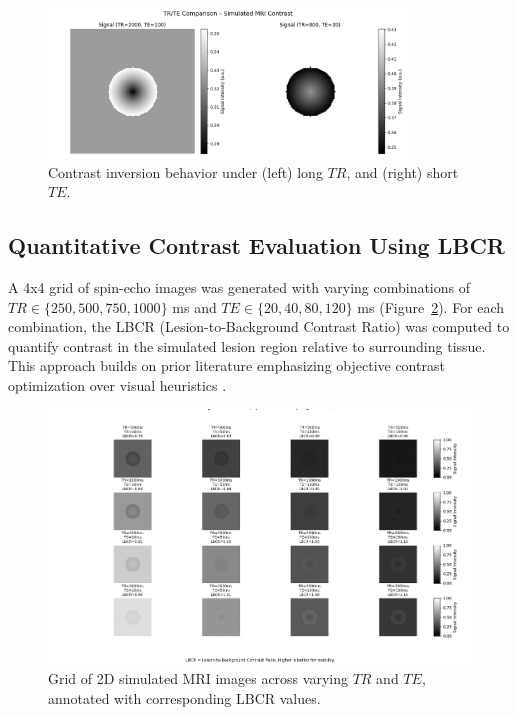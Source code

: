 \documentclass[10pt,a4paper,twoside]{article}
\begin{document}
\begin{figure}[htbp!]
\centering
\includegraphics[width=0.85\textwidth]{trtecomparisonforcontrast.png}
\caption{Contrast inversion behavior under (left) long \( TR \), and (right) short \( TE \).}
\label{fig:inversion}
\end{figure}

\subsection{Quantitative Contrast Evaluation Using LBCR}

A 4x4 grid of spin-echo images was generated with varying combinations of \( TR \in \{250, 500, 750, 1000\} \) ms and \( TE \in \{20, 40, 80, 120\} \) ms (Figure~\ref{fig:grid}). For each combination, the LBCR (Lesion-to-Background Contrast Ratio) was computed to quantify contrast in the simulated lesion region relative to surrounding tissue. This approach builds on prior literature emphasizing objective contrast optimization over visual heuristics \cite{naganawa2002}.

\begin{figure}[htbp!]
\centering
\includegraphics[width=\textwidth]{trtegridwithlbcr.png}
\caption{Grid of 2D simulated MRI images across varying \( TR \) and \( TE \), annotated with corresponding LBCR values.}
\label{fig:grid}
\end{figure}
\end{document}
